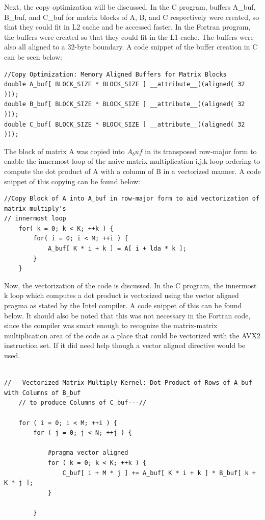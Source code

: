 \documentclass{article}
\begin{document}
Next, the copy optimization will be discussed. In the C program, buffers A\_buf, B\_buf, and C\_buf for matrix blocks of A, B, and C respectively were created, so that they could fit in L2 cache and be accessed faster. In the Fortran program, the buffers were created so that they could fit in the L1 cache. The buffers were also all aligned to a 32-byte boundary. A code snippet of the buffer creation in C can be seen below:

\begin{verbatim}
//Copy Optimization: Memory Aligned Buffers for Matrix Blocks
double A_buf[ BLOCK_SIZE * BLOCK_SIZE ] __attribute__((aligned( 32 )));
double B_buf[ BLOCK_SIZE * BLOCK_SIZE ] __attribute__((aligned( 32 )));
double C_buf[ BLOCK_SIZE * BLOCK_SIZE ] __attribute__((aligned( 32 )));
\end{verbatim}

\noindent The block of matrix A was copied into $A_buf$ in its transposed row-major form to enable the innermost loop of the naive matrix multiplication i,j,k loop ordering to compute the dot product of A with a column of B in a vectorized manner. A code snippet of this copying can be found below:

\begin{verbatim}
//Copy Block of A into A_buf in row-major form to aid vectorization of matrix multiply's
// innermost loop
    for( k = 0; k < K; ++k ) {
        for( i = 0; i < M; ++i ) {
            A_buf[ K * i + k ] = A[ i + lda * k ];
        }
    }
\end{verbatim}

Now, the vectorization of the code is discussed. In the C program, the innermost k loop which computes a dot product is vectorized using the vector aligned pragma as stated by the Intel compiler. A code snippet of this can be found below. It should also be noted that this was not necessary in the Fortran code, since the compiler was smart enough to recognize the matrix-matrix multiplication area of the code as a place that could be vectorized with the AVX2 instruction set. If it did need help though a vector aligned directive would be used.

\begin{verbatim}

//---Vectorized Matrix Multiply Kernel: Dot Product of Rows of A_buf with Columns of B_buf
    // to produce Columns of C_buf---//
    
    for ( i = 0; i < M; ++i ) {
        for ( j = 0; j < N; ++j ) {
            
            #pragma vector aligned
            for ( k = 0; k < K; ++k ) {
                C_buf[ i + M * j ] += A_buf[ K * i + k ] * B_buf[ k + K * j ];
            }
            
        }

\end{verbatim}
\end{document}
